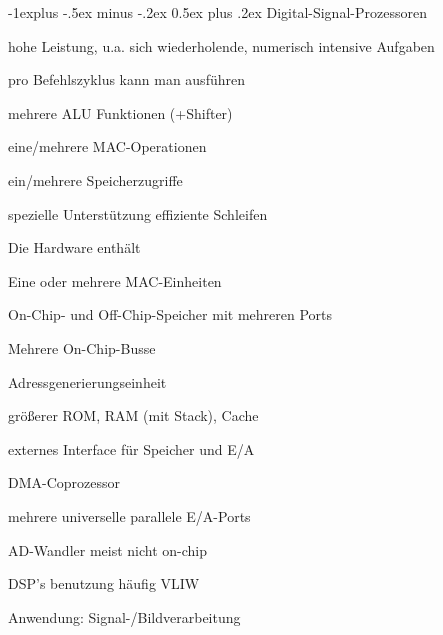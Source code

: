 \documentclass[a4paper]{article}
\makeatletter
\renewcommand{\subsection}{\@startsection{subsection}{2}{0mm}%
                                {-1explus -.5ex minus -.2ex}%
                                {0.5ex plus .2ex}%
                                {\normalfont\normalsize\bfseries}}
\makeatother
\begin{document}
\begin{multicols}{3}
  \subsection{Digital-Signal-Prozessoren}
  \begin{itemize*}
    \item hohe Leistung, u.a. sich wiederholende, numerisch intensive Aufgaben
    \item pro Befehlszyklus kann man ausführen
    \begin{itemize*}
      \item mehrere ALU Funktionen (+Shifter)
      \item eine/mehrere MAC-Operationen
      \item ein/mehrere Speicherzugriffe
      \item spezielle Unterstützung effiziente Schleifen
    \end{itemize*}
    \item Die Hardware enthält
    \begin{itemize*}
      \item Eine oder mehrere MAC-Einheiten
      \item On-Chip- und Off-Chip-Speicher mit mehreren Ports
      \item Mehrere On-Chip-Busse
      \item Adressgenerierungseinheit
      \item größerer ROM, RAM (mit Stack), Cache
      \item externes Interface für Speicher und E/A
      \item DMA-Coprozessor
      \item mehrere universelle parallele E/A-Ports
      \item AD-Wandler meist nicht on-chip
    \end{itemize*}
    \item DSP's benutzung häufig VLIW
    \item Anwendung: Signal-/Bildverarbeitung
  \end{itemize*}
  

\end{multicols}
\end{document}
